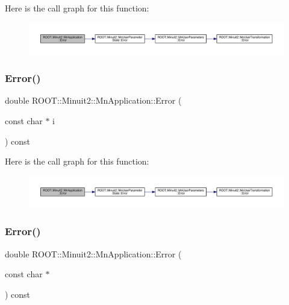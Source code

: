 Here is the call graph for this function\+:\nopagebreak
\begin{figure}[H]
\begin{center}
\leavevmode
\includegraphics[width=350pt]{df/dd5/classROOT_1_1Minuit2_1_1MnApplication_aedc3775627672ba2038e8a26d6df13f1_cgraph}
\end{center}
\end{figure}
\mbox{\label{classROOT_1_1Minuit2_1_1MnApplication_a6997e4fd745e4048609c697f74c92eb8}} 
\subsubsection{\texorpdfstring{Error()}{Error()}\hspace{0.1cm}{\footnotesize\ttfamily [3/4]}}
{\footnotesize\ttfamily double R\+O\+O\+T\+::\+Minuit2\+::\+Mn\+Application\+::\+Error (\begin{DoxyParamCaption}\item[{const char $\ast$}]{i }\end{DoxyParamCaption}) const}

Here is the call graph for this function\+:\nopagebreak
\begin{figure}[H]
\begin{center}
\leavevmode
\includegraphics[width=350pt]{df/dd5/classROOT_1_1Minuit2_1_1MnApplication_a6997e4fd745e4048609c697f74c92eb8_cgraph}
\end{center}
\end{figure}
\mbox{\label{classROOT_1_1Minuit2_1_1MnApplication_a6997e4fd745e4048609c697f74c92eb8}} 
\subsubsection{\texorpdfstring{Error()}{Error()}\hspace{0.1cm}{\footnotesize\ttfamily [4/4]}}
{\footnotesize\ttfamily double R\+O\+O\+T\+::\+Minuit2\+::\+Mn\+Application\+::\+Error (\begin{DoxyParamCaption}\item[{const char $\ast$}]{ }\end{DoxyParamCaption}) const}

